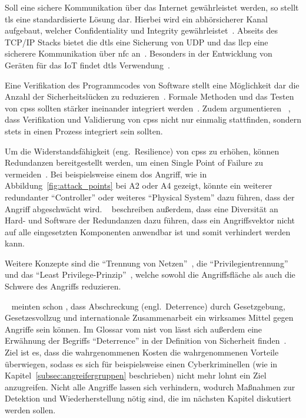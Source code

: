 \documentclass[final,bibliography=totocnumbered]{include/sikseminar}
\newcommand{\cps}{\glspl{cps}\xspace}
\begin{document}

    Soll eine sichere Kommunikation über das Internet gewährleistet werden, so stellt \gls{tls} eine standardisierte Lösung dar.
    Hierbei wird ein abhörsicherer Kanal aufgebaut, welcher Confidentiality und Integrity gewährleistet~\cite{SPB+16}.
   Abseits des TCP/IP Stacks bietet die \acrlong{dtls} eine Sicherung von UDP und das \acrlong{llcp} eine sicherere Kommunikation über \acrlong{nfc} an~\cite{SPB+16}.
    Besonders in der Entwicklung von Geräten für das IoT findet \gls{dtls} Verwendung~\cite{YWY+17,FPA+18}.


    Eine Verifikation des Programmcodes von Software stellt eine Möglichkeit dar die Anzahl der Sicherheitslücken zu reduzieren~\cite{CAS08}.
    Formale Methoden und das Testen von \cps sollten stärker ineinander integriert werden~\cite{RLS+10}.
    Zudem argumentieren \citeauthor{SGL+08}~\cite{SGL+08}, dass Verifikation und Validierung von \cps nicht nur einmalig stattfinden, sondern stets in einen Prozess integriert sein sollten.


    Um die Widerstandsfähigkeit (eng.\ Resilience) von \cps zu erhöhen, können Redundanzen bereitgestellt werden, um einen Single Point of Failure zu vermeiden~\cite{CAS+09}.
    Bei beispielsweise einem \gls{dos} Angriff, wie in Abbildung~\ref{fig:attack_points} bei A2 oder A4 gezeigt, könnte ein weiterer redundanter \enquote{Controller} oder weiteres \enquote{Physical System} dazu führen, dass der Angriff abgeschwächt wird.
    \citeauthor{CAS+09}~\cite{CAS+09} beschreiben außerdem, dass eine Diversität an Hard- und Software der Redundanzen dazu führen, dass ein Angriffsvektor nicht auf alle eingesetzten Komponenten anwendbar ist und somit verhindert werden kann.


    Weitere Konzepte sind die \enquote{Trennung von Netzen}~\cite{GK16}, die \enquote{Privilegientrennung} und das \enquote{Least Privilege-Prinzip}~\cite{CAS+09}, welche sowohl die Angriffsfläche als auch die Schwere des Angriffs reduzieren.

    \citeauthor{CAS+09}~\cite{CAS+09} meinten schon \citeyear{CAS+09}, dass Abschreckung (engl.\ Deterrence) durch Gesetzgebung, Gesetzesvollzug und internationale Zusammenarbeit ein wirksames Mittel gegen Angriffe sein können.
    Im Glossar vom \gls{nist} von \citeyear{Kissel13} lässt sich außerdem eine Erwähnung der Begriffs \enquote{Deterrence} in der Definition von Sicherheit finden~\cite{Kissel13}.
    Ziel ist es, dass die wahrgenommenen Kosten die wahrgenommenen Vorteile überwiegen, sodass es sich für beispielsweise einen Cyberkriminellen (wie in Kapitel~\ref{subsec:angreifergruppen} beschrieben) nicht mehr lohnt ein Ziel anzugreifen.
    Nicht alle Angriffe lassen sich verhindern, wodurch Maßnahmen zur Detektion und Wiederherstellung nötig sind, die im nächsten Kapitel diskutiert werden sollen.
\end{document}
